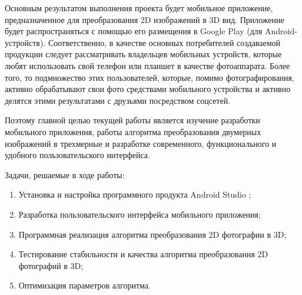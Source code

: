 Основным результатом выполнения проекта будет мобильное приложение, предназначенное для преобразования 2D изображений в 3D вид. Приложение будет распространяться с помощью его размещения в Google Play (для Android-устройств). Соответственно, в качестве основных потребителей создаваемой продукции следует рассматривать владельцев мобильных устройств, которые любят использовать свой телефон или планшет в качестве фотоаппарата. Более того, то подмножество этих пользователей, которые, помимо фотографирования, активно обрабатывают свои фото средствами мобильного устройства и активно делятся этими результатами с друзьями посредством соцсетей.

Поэтому главной целью текущей работы является изучение разработки мобильного приложения, работы алгоритма преобразования двумерных изображений в трехмерные и разработке современного, функционального и удобного пользовательского интерфейса. 

Задачи, решаемые в ходе работы:
\begin{enumerate}
	\item Установка и настройка программного продукта Android Studio ;
	\item Разработка пользовательского интерфейса мобильного приложения;
	\item Программная реализация алгоритма преобразования 2D фотографии в 3D;
	\item Тестирование стабильности и качества алгоритма преобразования 2D фотографий в 3D;
	\item Оптимизация параметров алгоритма.
\end{enumerate}